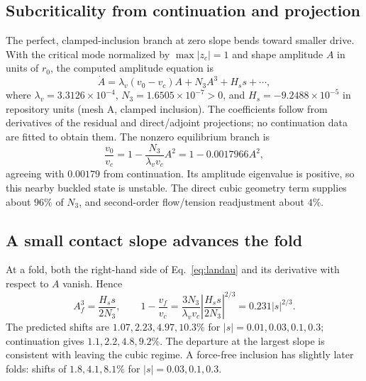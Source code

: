 \subsection{Subcriticality from continuation and projection}
The perfect, clamped-inclusion branch at zero slope bends toward smaller drive. With the critical mode normalized by $\max|z_c|=1$ and shape amplitude $A$ in units of $r_0$, the computed amplitude equation is
\begin{equation}
\dot A=\lambda_v(v_0-v_c)A+N_3A^3+H_s s+\cdots,\label{eq:landau}
\end{equation}
where $\lambda_v=3.3126\times10^{-4}$, $N_3=1.6505\times10^{-7}>0$, and $H_s=-9.2488\times10^{-5}$ in repository units (mesh A, clamped inclusion). The coefficients follow from derivatives of the residual and direct/adjoint projections; no continuation data are fitted to obtain them. The nonzero equilibrium branch is
\begin{equation}
\frac{v_0}{v_c}=1-\frac{N_3}{\lambda_vv_c}A^2
=1-0.0017966A^2,\label{eq:branch}
\end{equation}
agreeing with $0.00179$ from continuation. Its amplitude eigenvalue is positive, so this nearby buckled state is unstable. The direct cubic geometry term supplies about $96\%$ of $N_3$, and second-order flow/tension readjustment about $4\%$.


\subsection{A small contact slope advances the fold}
At a fold, both the right-hand side of Eq.~\eqref{eq:landau} and its derivative with respect to $A$ vanish. Hence
\begin{equation}
A_f^3=\frac{H_s s}{2N_3},\qquad
1-\frac{v_f}{v_c}=\frac{3N_3}{\lambda_vv_c}\left|\frac{H_s s}{2N_3}\right|^{2/3}
=0.231|s|^{2/3}.\label{eq:koiter}
\end{equation}
The predicted shifts are $1.07,2.23,4.97,10.3\%$ for $|s|=0.01,0.03,0.1,0.3$; continuation gives $1.1,2.2,4.8,9.2\%$. The departure at the largest slope is consistent with leaving the cubic regime. A force-free inclusion has slightly later folds: shifts of $1.8,4.1,8.1\%$ for $|s|=0.03,0.1,0.3$.

